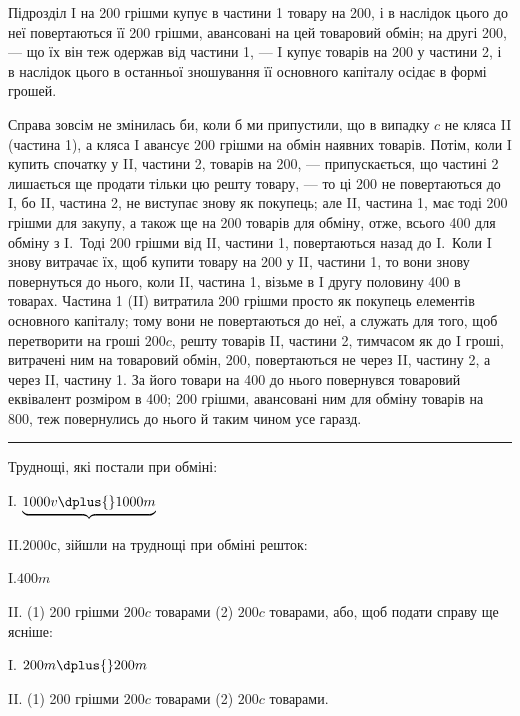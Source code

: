 
Підрозділ I на 200 грішми купує в частини 1 товару на
200, і в наслідок цього до неї повертаються її 200 грішми,
авансовані на цей товаровий обмін; на другі 200, — що їх він
теж одержав від частини 1, — I купує товарів на 200 у частини 2, і в
наслідок цього в останньої зношування її основного капіталу осідає в
формі грошей.

Справа зовсім не змінилась би, коли б ми припустили, що в випадку
$c$ не кляса II (частина 1), а кляса I авансує 200 грішми на обмін наявних
товарів. Потім, коли I купить спочатку у II, частини 2, товарів на
200, — припускається, що частині 2 лишається ще продати тільки цю
решту товару, — то ці 200 не повертаються до I, бо II, частина
2, не виступає знову як покупець; але II, частина 1, має тоді 200
грішми для закупу, а також ще на 200 товарів для обміну, отже, всього
400 для обміну з I.~Тоді 200 грішми від II, частини 1, повертаються
назад до I.~Коли I знову витрачає їх, щоб купити товару на
200 у II, частини 1, то вони знову повернуться до нього, коли II,
частина 1, візьме в I другу половину 400 в товарах. Частина 1 (II)
витратила 200 грішми просто як покупець елементів основного
капіталу; тому вони не повертаються до неї, а служать для того,
щоб перетворити на гроші $200 c$, решту товарів II, частини 2, тимчасом
як до I гроші, витрачені ним на товаровий обмін, 200, повертаються
не через II, частину 2, а через II, частину 1. За його товари
на 400 до нього повернувся товаровий еквівалент розміром в 400;
200 грішми, авансовані ним для обміну товарів на 800, теж
повернулись до нього й таким чином усе гаразд.

\pfbreak

Труднощі, які постали при обміні:

I. $\underbrace{1000 v \dplus{} 1000 m}^{}$

II.\makebox[20pt]{}$2000 с$, зійшли на труднощі при обміні решток:

I.\makebox[25pt]{\dotfill{}}$400 m$

II. (1) 200 грішми \dplus{} $200 c$ товарами \dplus{} (2) $200 c$ товарами, або, щоб
подати справу ще ясніше:

I.  $200 m \dplus{} 200 m$

II. (1) 200 грішми \dplus{} $200 c$ товарами \dplus{} (2) $200 c$ товарами.

